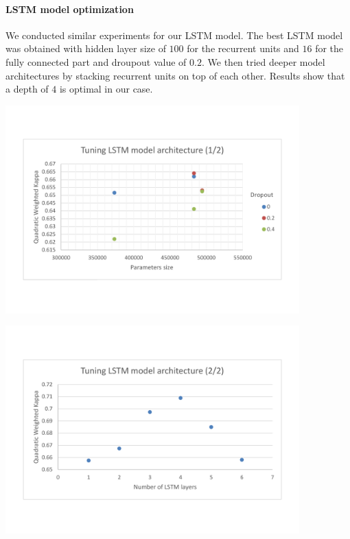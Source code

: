 \documentclass[a4paper,12pt,english]{article}
\begin{document}
\paragraph{LSTM model optimization} We conducted similar experiments for our LSTM model. The best LSTM model was obtained with hidden layer size of $100$ for the recurrent units and $16$ for the fully connected part and droupout value of $0.2$. We then tried deeper model architectures by stacking recurrent units on top of each other. Results show that a depth of $4$ is optimal in our case.

\begin{center}
\vspace*{-1.5cm}
\includegraphics[width=0.85\textwidth]{fig/tune_lstm_arch_1.pdf}
\vspace*{-1.5cm}
\end{center}

\begin{center}
\vspace*{-1.5cm}
\includegraphics[width=0.85\textwidth]{fig/tune_lstm_arch_2.pdf}
\vspace*{-1.5cm}
\end{center}
\end{document}
